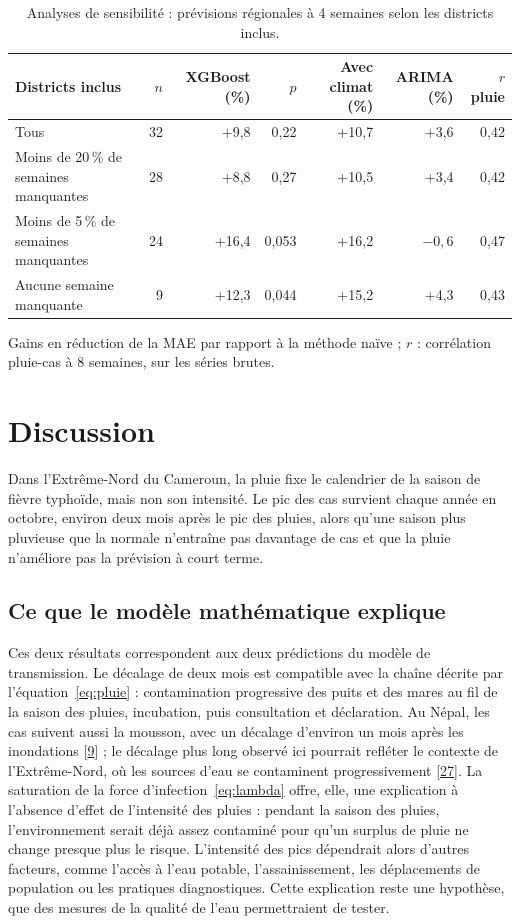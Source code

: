 \documentclass[11pt]{article}
\begin{document}
\begin{table}[!htbp]\centering\small
\caption{Analyses de sensibilité : prévisions régionales à 4 semaines selon les districts inclus.}\label{tab:sens}
\begin{tabularx}{\linewidth}{@{}L r r r r r r@{}}\toprule
Districts inclus & $n$ & XGBoost (\%) & $p$ & Avec climat (\%) & ARIMA (\%) & $r$ pluie \\\midrule
Tous & 32 & +9,8 & 0,22 & +10,7 & +3,6 & 0,42 \\
Moins de 20\,\% de semaines manquantes & 28 & +8,8 & 0,27 & +10,5 & +3,4 & 0,42 \\
Moins de 5\,\% de semaines manquantes & 24 & +16,4 & 0,053 & +16,2 & $-0{,}6$ & 0,47 \\
Aucune semaine manquante & 9 & +12,3 & 0,044 & +15,2 & +4,3 & 0,43 \\\bottomrule
\end{tabularx}
\par\smallskip\raggedright Gains en réduction de la MAE par rapport à la méthode naïve ; $r$ : corrélation pluie-cas à 8 semaines, sur les séries brutes.
\end{table}

\section{Discussion}
Dans l'Extrême-Nord du Cameroun, la pluie fixe le calendrier de la saison de fièvre typhoïde, mais non son intensité. Le pic des cas survient chaque année en octobre, environ deux mois après le pic des pluies, alors qu'une saison plus pluvieuse que la normale n'entraîne pas davantage de cas et que la pluie n'améliore pas la prévision à court terme.

\subsection{Ce que le modèle mathématique explique}
Ces deux résultats correspondent aux deux prédictions du modèle de transmission. Le décalage de deux mois est compatible avec la chaîne décrite par l'équation~\eqref{eq:pluie} : contamination progressive des puits et des mares au fil de la saison des pluies, incubation, puis consultation et déclaration. Au Népal, les cas suivent aussi la mousson, avec un décalage d'environ un mois après les inondations [\hyperlink{ref9}{9}] ; le décalage plus long observé ici pourrait refléter le contexte de l'Extrême-Nord, où les sources d'eau se contaminent progressivement [\hyperlink{ref27}{27}]. La saturation de la force d'infection~\eqref{eq:lambda} offre, elle, une explication à l'absence d'effet de l'intensité des pluies : pendant la saison des pluies, l'environnement serait déjà assez contaminé pour qu'un surplus de pluie ne change presque plus le risque. L'intensité des pics dépendrait alors d'autres facteurs, comme l'accès à l'eau potable, l'assainissement, les déplacements de population ou les pratiques diagnostiques. Cette explication reste une hypothèse, que des mesures de la qualité de l'eau permettraient de tester.
\end{document}
